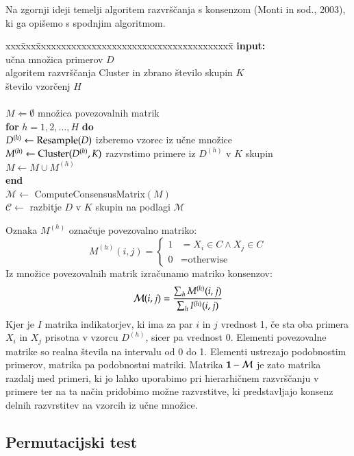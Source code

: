 Na zgornji ideji temelji algoritem razvrščanja s
konsenzom (Monti in sod., 2003), ki ga opišemo s spodnjim algoritmom.

\begin{tabbing}
xxx\=xxx\=xxxxxxxxxxxxxxxxxxxxxxxxxxxxxxxxxxxxxxx\=\kill
{\bf input:} \\
\> učna množica primerov $D$ \\
\> algoritem razvrščanja Cluster in zbrano število skupin $K$ \\
\> število vzorčenj $H$ \\
\\
$M\Leftarrow\emptyset$ \>\>\> množica povezovalnih matrik\\
{\bf for} $h=1,2,\ldots, H$ {\bf do} \\
\> $D^{(h)}\leftarrow {\rm Resample}(D)$ \>\> izberemo vzorec iz
učne množice \\
\> $M^{(h)}\leftarrow {\rm Cluster}(D^{(h)}, K)$ \>\> razvrstimo
primere iz $D^{(h)}$ v $K$ skupin \\
\> $M\leftarrow M\cup M^{(h)}$ \\
{\bf end} \\
$\mathcal{M}\leftarrow$ ComputeConsensusMatrix$(M)$ \\
$\mathcal{C}\leftarrow$ razbitje $D$ v $K$ skupin na podlagi $\mathcal{M}$
\end{tabbing}

Oznaka $M^{(h)}$ označuje povezovalno matriko:
$$ M^{(h)}(i,j) = \left\{
     \begin{array}{ll}
       1 & = X_i\in C\wedge X_j\in C \\
       0 & = \text{otherwise}
     \end{array}
   \right.$$
Iz množice povezovalnih matrik izračunamo matriko konsenzov:
$$ \mathcal{M}(i,j) = {\sum_h M^{(h)}(i,j) \over \sum_h
  I^{(h)}(i,j)} $$
Kjer je $I$ matrika indikatorjev, ki ima za par $i$ in $j$ vrednost 1,
če sta oba primera $X_i$ in $X_j$ prisotna v vzorcu $D^{(h)}$, sicer
pa vrednost 0. Elementi povezovalne matrike so realna števila na
intervalu od 0 do 1. Elementi ustrezajo podobnostim primerov, matrika
pa podobnostni matriki. Matrika ${\bf 1}-\mathcal{M}$ je zato matrika
razdalj med primeri, ki jo lahko uporabimo pri hierarhičnem
razvrščanju v primere ter na ta način pridobimo možne razvrstitve, ki
predstavljajo konsenz delnih razvrstitev na vzorcih iz učne množice.

\subsection{Permutacijski test}

